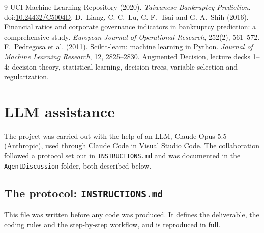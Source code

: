 \documentclass[11pt,a4paper]{article}
\begin{document}
\begin{thebibliography}{9}\footnotesize\setlength{\itemsep}{0.5pt}
 UCI Machine Learning Repository (2020). \emph{Taiwanese Bankruptcy Prediction}. doi:\href{https://doi.org/10.24432/C5004D}{10.24432/C5004D}.
 D.~Liang, C.-C.~Lu, C.-F.~Tsai and G.-A.~Shih (2016). Financial ratios and corporate governance indicators in bankruptcy prediction: a comprehensive study. \emph{European Journal of Operational Research}, 252(2), 561–572.
 F.~Pedregosa et al. (2011). Scikit-learn: machine learning in Python. \emph{Journal of Machine Learning Research}, 12, 2825–2830.
 Augmented Decision, lecture decks 1–4: decision theory, statistical learning, decision trees, variable selection and regularization.
\end{thebibliography}

\clearpage
\appendix
\section{LLM assistance}

The project was carried out with the help of an LLM, Claude Opus 5.5 (Anthropic), used through Claude Code in Visual Studio Code. The collaboration followed a protocol set out in \texttt{INSTRUCTIONS.md} and was documented in the \texttt{AgentDiscussion} folder, both described below.

\subsection{The protocol: \texttt{INSTRUCTIONS.md}}
This file was written before any code was produced. It defines the deliverable, the coding rules and the step-by-step workflow, and is reproduced in full.


\end{document}
